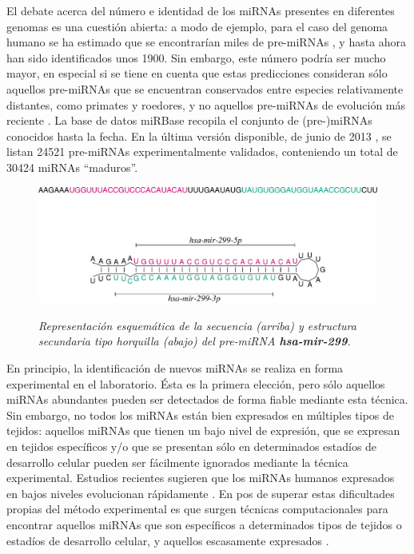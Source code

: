 \documentclass[12pt,bibliography=oldstyle,DIV=12,parskip=full-]{scrartcl}
\begin{document}
\newpage
El debate acerca del número e identidad de los miRNAs presentes en
diferentes genomas es una cuestión abierta: a modo de ejemplo, para el
caso del genoma humano se ha estimado que se encontrarían miles de
pre-miRNAs \cite{batuwita}, y hasta ahora han sido identificados unos
1900. Sin embargo, este número podría ser mucho mayor, en especial si
se tiene en cuenta que estas predicciones consideran sólo aquellos
pre-miRNAs que se encuentran conservados entre especies
relativamente distantes, como primates y roedores, y no aquellos
pre-miRNAs de evolución más reciente \cite{sewer}.  La base de datos
miRBase%
\cite{mirbase2}\cite{mirbase3} recopila el conjunto de
\mbox{(pre-)miRNAs} conocidos hasta la fecha. En la última versión
disponible, de junio de
2013%
, se listan
24521 pre-miRNAs experimentalmente validados, conteniendo un total de
30424 miRNAs ``maduros''.
%
\begin{figure}
  \small\slshape\center
  \includegraphics[width=.9\textwidth]{res/hsa-mir-299_ss.pdf}
  \caption{\small\slshape Representación esquemática de la secuencia (arriba) y
    estructura secundaria tipo horquilla (abajo) del pre-miRNA
    \textbf{hsa-mir-299}.
  }
  \label{horquilla}
\end{figure}

%
%
En principio, la identificación de nuevos miRNAs se realiza en forma
experimental en el laboratorio. Ésta es la primera elección, pero sólo
aquellos miRNAs abundantes pueden ser detectados de forma fiable
mediante esta técnica. Sin embargo, no todos los miRNAs están bien
expresados en múltiples tipos de tejidos: aquellos miRNAs que tienen
un bajo nivel de expresión, que se expresan en tejidos específicos y/o
que se presentan sólo en determinados estadíos de desarrollo celular
pueden ser fácilmente ignorados mediante la técnica
experimental. Estudios recientes sugieren que los miRNAs humanos
expresados en bajos niveles evolucionan rápidamente
\cite{ding}\cite{xu}. En pos de superar estas dificultades propias
del método experimental es que surgen técnicas computacionales para
encontrar aquellos miRNAs que son específicos a determinados tipos de
tejidos o estadíos de desarrollo celular, y aquellos escasamente
expresados \cite{sheng}\cite{xu}.
\end{document}
